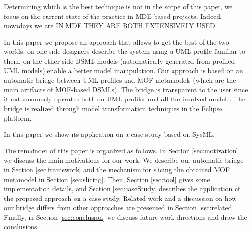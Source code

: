 Determining which is the best technique is not in the scope of this paper, we focus on the current state-of-the-practice
in MDE-based projects. Indeed, nowadays we are      IN MDE THEY ARE BOTH EXTENSIVELY USED  




In this paper we propose an approach that allows to get the best of the two worlds: 
on one side designers describe the system using a UML profile familiar to them, on the other side DSML models (automatically generated from profiled UML models) enable a better model manipulation. Our approach is based on an automatic bridge between UML profiles and MOF metamodels (which are the main artifacts of MOF-based DSMLs). The bridge is transparent to the user since it autonomously operates both on UML profiles 
and all the involved models. The bridge is realized through model transformation techniques in the Eclipse platform.



 In this paper we show its application on a case study based on SysML.


The remainder of this paper is organized as follows. In Section \ref{sec:motivation} we discuss the main motivations for our work.
We describe our automatic bridge in Section \ref{sec:framework} and the mechanism for slicing the obtained MOF metamodel 
in Section \ref{sec:slicing}. 
Then, Section \ref{sec:tool} gives some implementation details, and Section \ref{sec:caseStudy} describes the application of
the proposed approach on a case study. Related work and a discussion on how our bridge differs from other approaches
are presented in Section \ref{sec:related}. 
Finally, in Section \ref{sec:conclusion} we discuss future work directions and draw the conclusions. 

















